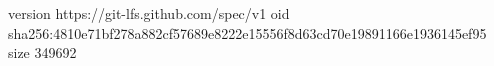 version https://git-lfs.github.com/spec/v1
oid sha256:4810e71bf278a882cf57689e8222e15556f8d63cd70e19891166e1936145ef95
size 349692

